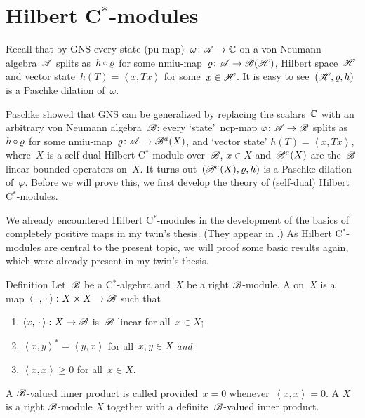 \documentclass[b]{subfiles}
\begin{document}
\section{Hilbert C$^*$-modules}
\begin{parsec}%
\begin{point}%
Recall that by GNS
    every state (pu-map)~$\omega\colon \mathscr{A} \to \mathbb{C}$
    on a von Neumann algebra~$\mathscr{A}$
    splits as~$h \mathop{\circ} \varrho$
    for some nmiu-map~$\varrho\colon \mathscr{A} \to \mathscr{B}(\mathscr{H})$,
        Hilbert space~$\mathscr{H}$
        and vector state~$h (T) =  \left<x, T x\right>$
         for some~$x \in \mathscr{H}$.
It is easy to see~$(\mathscr{H}, \varrho, h)$ is a Paschke dilation of~$\omega$.


Paschke showed that GNS can be generalized by replacing the scalars~$\mathbb{C}$
    with an arbitrary von Neumann algebra~$\mathscr{B}$:
    every `state'~ncp-map $\varphi\colon \mathscr{A} \to \mathscr{B}$
    splits as~$h \mathop{\circ} \varrho$
    for some nmiu-map~$\varrho\colon \mathscr{A} \to \mathscr{B}^a (X)$,
    and `vector state' $h(T) = \left<x, Tx\right>$,
    where~$X$ is a self-dual Hilbert C$^*$-module over~$\mathscr{B}$, $x \in X$
     and~$\mathscr{B}^a(X)$ are the~$\mathscr{B}$-linear bounded operators on~$X$.
It turns out~$(\mathscr{B}^a(X), \varrho, h)$
    is a Paschke dilation of~$\varphi$.
Before we will prove this,
    we first develop the theory of (self-dual) Hilbert C$^*$-modules.

We already encountered Hilbert C$^*$-modules
    in the development of the basics of completely positive maps
    in my twin's thesis. (They appear in .)
As Hilbert C$^*$-modules are central to the present topic,
    we will proof some basic results again, which were already present
    in my twin's thesis.
\end{point}
\begin{point}{Definition}%
    Let~$\mathscr{B}$ be a C$^*$-algebra and~$X$
        be a right $\mathscr{B}$-module.
        A  on~$X$
        is a map~$\left<\,\cdot\,,\,\cdot\,\right>\colon X \times X \to \mathscr{B}$
        such that
        \begin{enumerate}
            \item $\left<x, \,\cdot\,\right> \colon X \to  \mathscr{B}$
                    is~$\mathscr{B}$-linear for all~$x \in X$;
            \item $\left<x,y\right>^* = \left<y,x\right>$
                for all~$x,y\in X$ \emph{and}
            \item $\left<x,x\right> \geq 0$ for all~$x \in X$.
        \end{enumerate}
    A $\mathscr{B}$-valued inner product is called 
        provided~$x = 0$ whenever~$\left<x,x\right>=0$.
    A  $X$
        is a right $\mathscr{B}$-module $X$
        together with a definite~$\mathscr{B}$-valued inner product.


\end{point}
\end{parsec}
\end{document}
